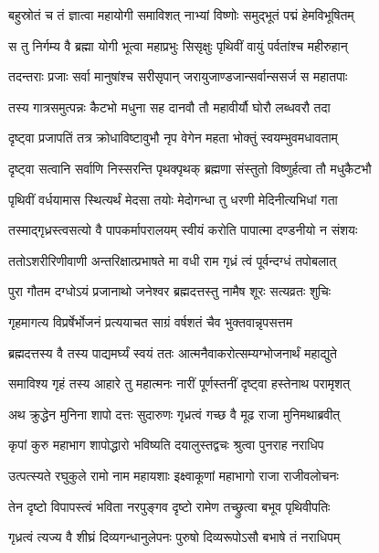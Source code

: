 \twolineshloka
{बहुस्रोतं च तं ज्ञात्वा महायोगी समाविशत्}
{नाभ्यां विष्णोः समुद्भूतं पद्मं हेमविभूषितम्}%

\twolineshloka
{स तु निर्गम्य वै ब्रह्मा योगी भूत्वा महाप्रभुः}
{सिसृक्षुः पृथिवीं वायुं पर्वतांश्च महीरुहान्}%

\twolineshloka
{तदन्तराः प्रजाः सर्वा मानुषांश्च सरीसृपान्}
{जरायुजाण्डजान्सर्वान्ससर्ज स महातपाः}%

\twolineshloka
{तस्य गात्रसमुत्पन्नः कैटभो मधुना सह}
{दानवौ तौ महावीर्यौ घोरौ लब्धवरौ तदा}%

\twolineshloka
{दृष्ट्वा प्रजापतिं तत्र क्रोधाविष्टावुभौ नृप}
{वेगेन महता भोक्तुं स्वयम्भुवमधावताम्}%

\twolineshloka
{दृष्ट्वा सत्वानि सर्वाणि निस्सरन्ति पृथक्पृथक्}
{ब्रह्मणा संस्तुतो विष्णुर्हत्वा तौ मधुकैटभौ}%

\twolineshloka
{पृथिवीं वर्धयामास स्थित्यर्थं मेदसा तयोः}
{मेदोगन्धा तु धरणी मेदिनीत्यभिधां गता}%

\twolineshloka
{तस्माद्गृध्रस्त्वसत्यो वै पापकर्मापरालयम्}
{स्वीयं करोति पापात्मा दण्डनीयो न संशयः}%

\twolineshloka
{ततोऽशरीरिणीवाणी अन्तरिक्षात्प्रभाषते}
{मा वधी राम गृध्रं त्वं पूर्वन्दग्धं तपोबलात्}%

\twolineshloka
{पुरा गौतम दग्धोऽयं प्रजानाथो जनेश्वर}
{ब्रह्मदत्तस्तु नामैष शूरः सत्यव्रतः शुचिः}%

\twolineshloka
{गृहमागत्य विप्रर्षेर्भोजनं प्रत्ययाचत}
{साग्रं वर्षशतं चैव भुक्तवान्नृपसत्तम}%

\twolineshloka
{ब्रह्मदत्तस्य वै तस्य पाद्यमर्घ्यं स्वयं ततः}
{आत्मनैवाकरोत्सम्यग्भोजनार्थं महाद्युते}%

\twolineshloka
{समाविश्य गृहं तस्य आहारे तु महात्मनः}
{नारीं पूर्णस्तनीं दृष्ट्वा हस्तेनाथ परामृशत्}%

\twolineshloka
{अथ क्रुद्धेन मुनिना शापो दत्तः सुदारुणः}
{गृध्रत्वं गच्छ वै मूढ राजा मुनिमथाब्रवीत्}%

\twolineshloka
{कृपां कुरु महाभाग शापोद्धारो भविष्यति}
{दयालुस्तद्वचः श्रुत्वा पुनराह नराधिप}%

\twolineshloka
{उत्पत्स्यते रघुकुले रामो नाम महायशाः}
{इक्ष्वाकूणां महाभागो राजा राजीवलोचनः}%

\twolineshloka
{तेन दृष्टो विपापस्त्वं भविता नरपुङ्गव}
{दृष्टो रामेण तच्छ्रुत्वा बभूव पृथिवीपतिः}%

\twolineshloka
{गृध्रत्वं त्यज्य वै शीघ्रं दिव्यगन्धानुलेपनः}
{पुरुषो दिव्यरूपोऽसौ बभाषे तं नराधिपम्}%

